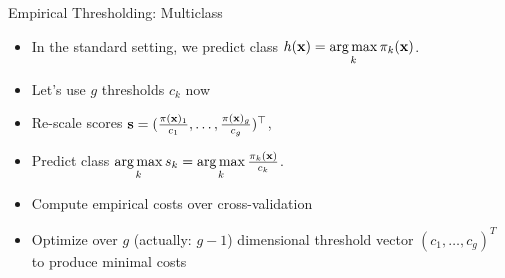 \documentclass[11pt,compress,t,notes=noshow, xcolor=table]{beamer}
\begin{document}
\begin{frame}{Empirical Thresholding: Multiclass}
    \begin{itemize}
        
        
            \item In the standard setting, we predict class $h(\mathbf{x}) = \mathop{\mathrm{arg\,max}}\limits_{k} \pi_{k}(\mathbf{x})$.
            
            \item Let's use $g$ thresholds $c_k$ now 
            
            \item Re-scale scores $ \mathbf{s} = (\frac{\pi(\mathbf{x})_1}{c_1},\ldots, \frac{\pi(\mathbf{x})_g}{ c_g})^\top$, 
            \item Predict class $\mathop{\mathrm{arg\,max}}\limits_k s_k = \mathop{\mathrm{arg\,max}}\limits_k \frac{\pi_{k}(\mathbf{x})}{c_k}$.

            \item Compute empirical costs over cross-validation

            \item Optimize over $g$ (actually: $g-1$) dimensional threshold vector $(c_1, \ldots, c_g)^T$ to produce minimal costs

    \end{itemize}
\end{frame}

%
%                   
%
\end{document}
